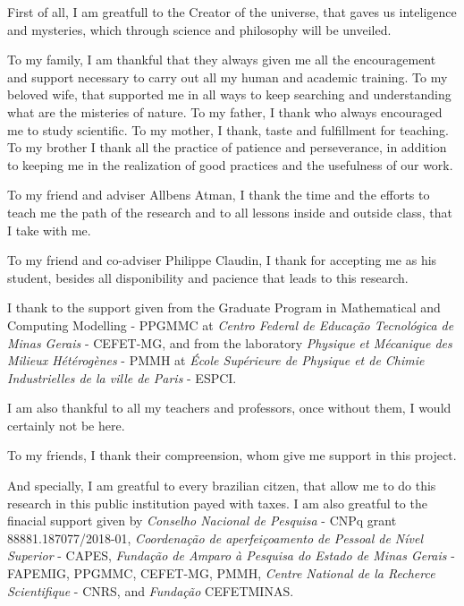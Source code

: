 
\begin{agradecimentos}[Acknowledgements]

First of all, I am greatfull to the Creator of the universe, that gaves us inteligence and mysteries, which through science and philosophy will be unveiled.

To my family, I am thankful that they always given me all the encouragement and support necessary to carry out all my human and academic training. To my beloved wife, that supported me in all ways to keep searching and understanding what are the misteries of nature. To my father, I thank who always encouraged me to study scientific. To my mother, I thank, taste and fulfillment for teaching. To my brother I thank all the practice of patience and perseverance, in addition to keeping me in the realization of good practices and the usefulness of our work.

To my friend and adviser Allbens Atman, I thank the time and the efforts to teach me the path of the research and to all lessons inside and outside class, that I take with me.

To my friend and co-adviser Philippe Claudin, I thank for accepting me as his student, besides all disponibility and pacience that leads to this research.

I thank to the support given from the Graduate Program in Mathematical and Computing Modelling - PPGMMC at \textit{Centro Federal de Educação Tecnológica de Minas Gerais} - CEFET-MG, and from the laboratory \textit{Physique et Mécanique des Milieux Hétérogènes} - PMMH at \textit{École Supérieure de Physique et de Chimie Industrielles de la ville de Paris} - ESPCI.

I am also thankful to all my teachers and professors, once without them, I would certainly not be here.

To my friends, I thank their compreension, whom give me support in this project.

And specially, I am greatful to every brazilian citzen, that allow me to do this research in this public institution payed with taxes. I am also greatful to the finacial support given by \textit{Conselho Nacional de Pesquisa} - CNPq grant 88881.187077/2018-01, \textit{Coordenação de aperfeiçoamento de Pessoal de Nível Superior} - CAPES, \textit{Fundação de Amparo à Pesquisa do Estado de Minas Gerais} - FAPEMIG, PPGMMC, CEFET-MG, PMMH, \textit{Centre National de la Recherce Scientifique} - CNRS, and \textit{Fundação} CEFETMINAS.


\end{agradecimentos}


